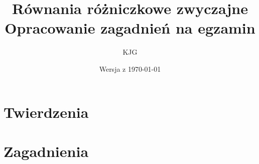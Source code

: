\documentclass{mwart}
\title{
  \huge \textbf{Równania różniczkowe zwyczajne} \\
  \Large Opracowanie zagadnień na egzamin
}
\author{ KJG }
\date{ Wersja z \today }
\DeclarePairedDelimiter\norm{\lVert}{\rVert}
\begin{document}
	
  \maketitle
  \newpage
  
  \tableofcontents
  \newpage
  
  \section{Twierdzenia}
  
  \section{Zagadnienia}
\end{document}
